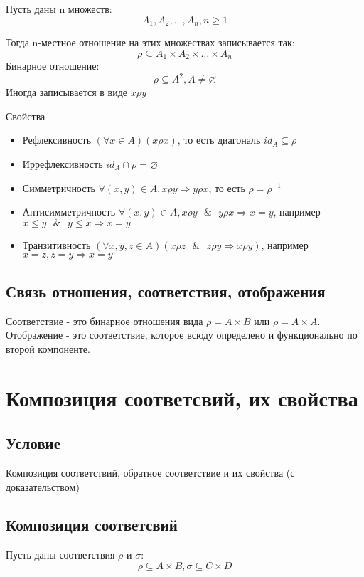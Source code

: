 \documentclass{report}
\newcommand{\band}{\mbox{ } \& \mbox{ }}
\begin{document}
Пусть даны n множеств:
\[
A_1,A_2, \ldots, A_{n}, n\ge 1
\] 

Тогда n-местное отношение на этих множествах записывается так:
\[
\rho \subseteq A_1 \times A_2 \times \ldots \times A_{n}
\] 
Бинарное отношение:
\[
	\rho \subseteq A^2, A \neq \varnothing
\] 
Иногда записывается в виде $x\rho y$

\medskip

Свойства
\begin{itemize}
	\item Рефлексивность\newline
	      $(\forall x \in A)(x\rho x)$, то есть диагональ $id_A \subseteq \rho$
	\item Иррефлексивность\newline
	      $id_A \cap \rho = \varnothing$
	\item Симметричность\newline
	      $\forall (x,y) \in A, x\rho y \Rightarrow y\rho x$, то есть $\rho = \rho^{-1}$
	\item  Антисимметричность\newline
	      $\forall (x,y) \in A, x\rho y \band y\rho x \Rightarrow x = y$, например $x \leq y \band y \leq x \Rightarrow x = y$
	\item Транзитивность\newline
	      $(\forall x,y,z \in A)(x\rho z \band z\rho y \Rightarrow x\rho y)$, например $x = z, z = y \Rightarrow x = y$
\end{itemize}

\subsection{Связь отношения, соответствия, отображения}
Соответствие - это бинарное отношения вида $\rho = A \times B$ или $\rho = A \times A$.
Отображение - это соответствие, которое всюду определено и функционально по второй компоненте.

\section{Композиция соответсвий, их свойства}
\subsection{Условие}
Композиция соответствий, обратное соответствие и их свойства (с доказательством)

\subsection{Композиция соответсвий}
Пусть даны соответствия $\rho$ и  $\sigma$:
\[
\rho \subseteq A \times B, \sigma \subseteq C \times D
\] 
\end{document}
